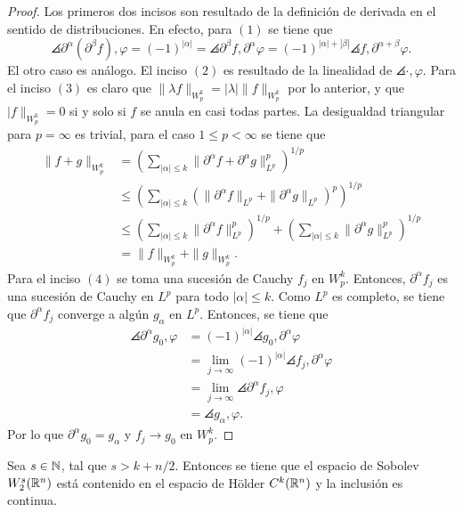 \begin{proof}
	Los primeros dos incisos son resultado de la definición de derivada en el sentido de distribuciones. En efecto, para $(1)$ se tiene que 
	\begin{equation*}
		\angles{\partial^\alpha(\partial^\beta f), \varphi} = 
		(-1)^{|\alpha|} = \angles{\partial^\beta f, \partial^\alpha\varphi} =
		(-1)^{|\alpha| + |\beta|} \angles{f, \partial^{\alpha+\beta}\varphi}. 
	\end{equation*}
	El otro caso es análogo. El inciso $(2)$ es resultado de la linealidad de $\angles{\cdot, \varphi}$.  Para el inciso $(3)$ es claro que $\|\lambda f\|_{W^k_p} = |\lambda|\|f\|_{W^k_p}$ por lo anterior, y que $|f\|_{W^k_p} = 0$ si y solo si $f$ se anula en casi todas partes. La desigualdad triangular para $p=\infty$ es trivial, para el caso $1\leq p<\infty$ se tiene que 
	\begin{align*}
		\|f+g\|_{W^k_p} &= \left(\sum_{|\alpha|\leq k} \|\partial^\alpha f + \partial^\alpha g\|_{L^p}^p
		\right)^{1/p} \\ 
		& \leq \left(\sum_{|\alpha|\leq k} (\|\partial^\alpha f\|_{L^p} +  \|\partial^\alpha g\|_{L^p})^p
		\right)^{1/p} \\
		& \leq \left(\sum_{|\alpha|\leq k} \|\partial^\alpha f\|_{L^p}^p
		\right)^{1/p} + \left(\sum_{|\alpha|\leq k} \|\partial^\alpha g\|_{L^p}^p
		\right)^{1/p} \\
		& = \|f\|_{W^k_p} + \|g\|_{W^k_p}.
	\end{align*}
	Para el inciso $(4)$ se toma una sucesión de Cauchy $f_j$ en $W^k_p$. Entonces, $\partial^\alpha f_j$ es una sucesión de Cauchy en $L^p$ para todo $|\alpha|\leq k$. Como $L^p$ es completo, se tiene que $\partial^\alpha f_j$ converge a algún $g_\alpha$ en $L^p$. Entonces, se tiene que
	\begin{align*}
		\angles{\partial^\alpha g_0, \varphi}& = (-1)^{|\alpha|}  \angles{g_0, \partial^\alpha \varphi} \\
		& = \lim_{j\rightarrow\infty}(-1)^{|\alpha|} \angles{f_j, \partial^\alpha \varphi} \\
		& =  \lim_{j\rightarrow\infty}\angles{\partial^\alpha f_j, \varphi} \\
		& = \angles{g_\alpha, \varphi}.
	\end{align*} 
	Por lo que $\partial^\alpha g_0 = g_\alpha$ y $f_j \rightarrow g_0$ en $W^k_p$.
\end{proof}
\begin{theorem}\label{theo:Sobolev-embedding-R}
	Sea $s\in\mathbb{N}$, tal que $s>k+n/2$. Entonces se tiene que el espacio de Sobolev $W^s_2(\mathbb{R}^n)$ está contenido en el espacio de H\"older $C^k(\mathbb{R}^n)$ y la inclusión es continua.
\end{theorem}

